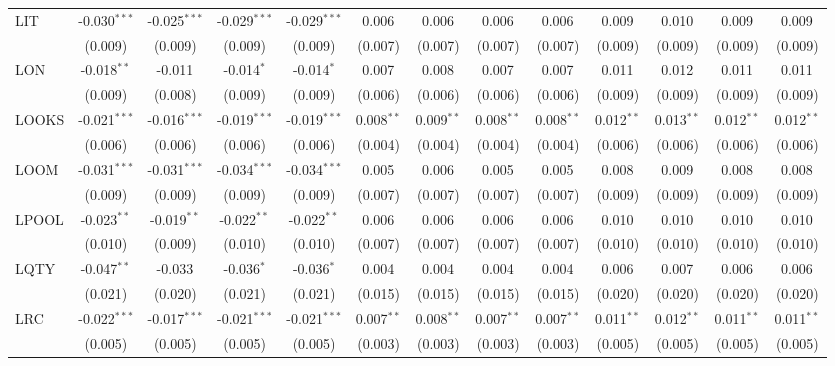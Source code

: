 \begin{table}[!htbp]
\begin{tabular}{@{\extracolsep{5pt}}lcccccccccccc}
 LIT & -0.030$^{***}$ & -0.025$^{***}$ & -0.029$^{***}$ & -0.029$^{***}$ & 0.006$^{}$ & 0.006$^{}$ & 0.006$^{}$ & 0.006$^{}$ & 0.009$^{}$ & 0.010$^{}$ & 0.009$^{}$ & 0.009$^{}$ \\
  & (0.009) & (0.009) & (0.009) & (0.009) & (0.007) & (0.007) & (0.007) & (0.007) & (0.009) & (0.009) & (0.009) & (0.009) \\
 LON & -0.018$^{**}$ & -0.011$^{}$ & -0.014$^{*}$ & -0.014$^{*}$ & 0.007$^{}$ & 0.008$^{}$ & 0.007$^{}$ & 0.007$^{}$ & 0.011$^{}$ & 0.012$^{}$ & 0.011$^{}$ & 0.011$^{}$ \\
  & (0.009) & (0.008) & (0.009) & (0.009) & (0.006) & (0.006) & (0.006) & (0.006) & (0.009) & (0.009) & (0.009) & (0.009) \\
 LOOKS & -0.021$^{***}$ & -0.016$^{***}$ & -0.019$^{***}$ & -0.019$^{***}$ & 0.008$^{**}$ & 0.009$^{**}$ & 0.008$^{**}$ & 0.008$^{**}$ & 0.012$^{**}$ & 0.013$^{**}$ & 0.012$^{**}$ & 0.012$^{**}$ \\
  & (0.006) & (0.006) & (0.006) & (0.006) & (0.004) & (0.004) & (0.004) & (0.004) & (0.006) & (0.006) & (0.006) & (0.006) \\
 LOOM & -0.031$^{***}$ & -0.031$^{***}$ & -0.034$^{***}$ & -0.034$^{***}$ & 0.005$^{}$ & 0.006$^{}$ & 0.005$^{}$ & 0.005$^{}$ & 0.008$^{}$ & 0.009$^{}$ & 0.008$^{}$ & 0.008$^{}$ \\
  & (0.009) & (0.009) & (0.009) & (0.009) & (0.007) & (0.007) & (0.007) & (0.007) & (0.009) & (0.009) & (0.009) & (0.009) \\
 LPOOL & -0.023$^{**}$ & -0.019$^{**}$ & -0.022$^{**}$ & -0.022$^{**}$ & 0.006$^{}$ & 0.006$^{}$ & 0.006$^{}$ & 0.006$^{}$ & 0.010$^{}$ & 0.010$^{}$ & 0.010$^{}$ & 0.010$^{}$ \\
  & (0.010) & (0.009) & (0.010) & (0.010) & (0.007) & (0.007) & (0.007) & (0.007) & (0.010) & (0.010) & (0.010) & (0.010) \\
 LQTY & -0.047$^{**}$ & -0.033$^{}$ & -0.036$^{*}$ & -0.036$^{*}$ & 0.004$^{}$ & 0.004$^{}$ & 0.004$^{}$ & 0.004$^{}$ & 0.006$^{}$ & 0.007$^{}$ & 0.006$^{}$ & 0.006$^{}$ \\
  & (0.021) & (0.020) & (0.021) & (0.021) & (0.015) & (0.015) & (0.015) & (0.015) & (0.020) & (0.020) & (0.020) & (0.020) \\
 LRC & -0.022$^{***}$ & -0.017$^{***}$ & -0.021$^{***}$ & -0.021$^{***}$ & 0.007$^{**}$ & 0.008$^{**}$ & 0.007$^{**}$ & 0.007$^{**}$ & 0.011$^{**}$ & 0.012$^{**}$ & 0.011$^{**}$ & 0.011$^{**}$ \\
  & (0.005) & (0.005) & (0.005) & (0.005) & (0.003) & (0.003) & (0.003) & (0.003) & (0.005) & (0.005) & (0.005) & (0.005) \\

\end{tabular}
\end{table}
